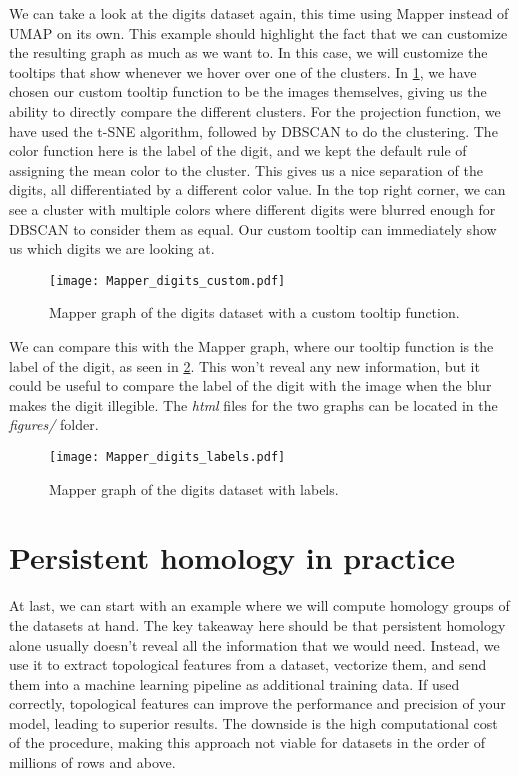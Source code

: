 We can take a look at the digits dataset again, this time using Mapper instead of UMAP on its own. This example should highlight the fact that we can customize the resulting graph as much as we want to. In this case, we will customize the tooltips that show whenever we hover over one of the clusters. In \ref{fig:mapper_digits_custom}, we have chosen our custom tooltip function to be the images themselves, giving us the ability to directly compare the different clusters. For the projection function, we have used the t-SNE algorithm, followed by DBSCAN to do the clustering. The color function here is the label of the digit, and we kept the default rule of assigning the mean color to the cluster. This gives us a nice separation of the digits, all differentiated by a different color value. In the top right corner, we can see a cluster with multiple colors where different digits were blurred enough for DBSCAN to consider them as equal. Our custom tooltip can immediately show us which digits we are looking at.

\begin{figure}[h!]
  \centering
  \texttt{[image: Mapper\_digits\_custom.pdf]}
  \caption{Mapper graph of the digits dataset with a custom tooltip function.}
  \label{fig:mapper_digits_custom}
\end{figure}

We can compare this with the Mapper graph, where our tooltip function is the label of the digit, as seen in \ref{fig:mapper_digits_labels}. This won't reveal any new information, but it could be useful to compare the label of the digit with the image when the blur makes the digit illegible. The \textit{html} files for the two graphs can be located in the \textit{figures/} folder.

\begin{figure}[h!]
  \centering
  \texttt{[image: Mapper\_digits\_labels.pdf]}
  \caption{Mapper graph of the digits dataset with labels.}
  \label{fig:mapper_digits_labels}
\end{figure}

\section{Persistent homology in practice}
At last, we can start with an example where we will compute homology groups of the datasets at hand. The key takeaway here should be that persistent homology alone usually doesn't reveal all the information that we would need. Instead, we use it to extract topological features from a dataset, vectorize them, and send them into a machine learning pipeline as additional training data. If used correctly, topological features can improve the performance and precision of your model, leading to superior results. The downside is the high computational cost of the procedure, making this approach not viable for datasets in the order of millions of rows and above.

